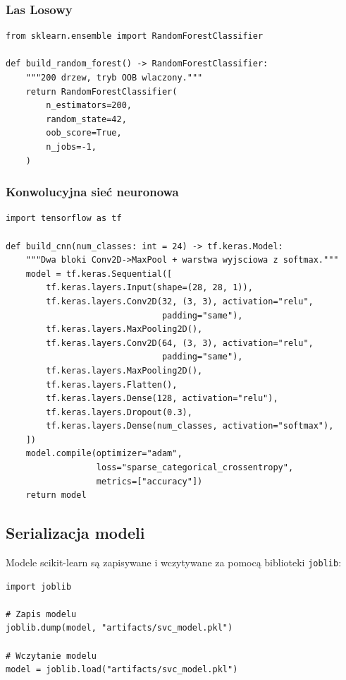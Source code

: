 \subsubsection{Las Losowy}

\begin{lstlisting}[style=stylePython, caption={Budowa Lasu Losowego (src/model/classifiers/random\_forest.py)}, label=lst:rf]
from sklearn.ensemble import RandomForestClassifier

def build_random_forest() -> RandomForestClassifier:
    """200 drzew, tryb OOB wlaczony."""
    return RandomForestClassifier(
        n_estimators=200,
        random_state=42,
        oob_score=True,
        n_jobs=-1,
    )
\end{lstlisting}

\subsubsection{Konwolucyjna sieć neuronowa}

\begin{lstlisting}[style=stylePython, caption={Architektura CNN (src/model/classifiers/cnn.py)}, label=lst:cnn]
import tensorflow as tf

def build_cnn(num_classes: int = 24) -> tf.keras.Model:
    """Dwa bloki Conv2D->MaxPool + warstwa wyjsciowa z softmax."""
    model = tf.keras.Sequential([
        tf.keras.layers.Input(shape=(28, 28, 1)),
        tf.keras.layers.Conv2D(32, (3, 3), activation="relu",
                               padding="same"),
        tf.keras.layers.MaxPooling2D(),
        tf.keras.layers.Conv2D(64, (3, 3), activation="relu",
                               padding="same"),
        tf.keras.layers.MaxPooling2D(),
        tf.keras.layers.Flatten(),
        tf.keras.layers.Dense(128, activation="relu"),
        tf.keras.layers.Dropout(0.3),
        tf.keras.layers.Dense(num_classes, activation="softmax"),
    ])
    model.compile(optimizer="adam",
                  loss="sparse_categorical_crossentropy",
                  metrics=["accuracy"])
    return model
\end{lstlisting}

\subsection{Serializacja modeli}

Modele scikit-learn są zapisywane i wczytywane za pomocą biblioteki \texttt{joblib}:

\begin{lstlisting}[style=stylePython, caption={Zapis i odczyt modelu scikit-learn}, label=lst:joblib]
import joblib

# Zapis modelu
joblib.dump(model, "artifacts/svc_model.pkl")

# Wczytanie modelu
model = joblib.load("artifacts/svc_model.pkl")
\end{lstlisting}

